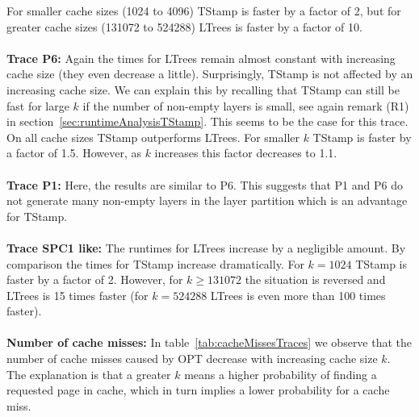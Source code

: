 \documentclass[a4paper,12pt, titlepage]{article}  %
\begin{document}
For smaller cache sizes (1024 to 4096) TStamp is faster by a factor of 2, but for greater 
cache sizes (131072 to 524288) LTrees  is faster by a factor of 10.\\
\\
\textbf{Trace P6:} Again the times for LTrees remain almost constant with increasing cache size (they
even decrease a little).
Surprisingly, TStamp is not affected by an increasing cache size. 
We can explain this by recalling that TStamp can still
be fast for large $k$ if the number of non-empty layers is small, see again remark (R1)
in section~\ref{sec:runtimeAnalysisTStamp}. This seems to be the case for this trace.
On all cache sizes TStamp outperforms LTrees.
For smaller $k$ TStamp is faster by a factor of 1.5. However, as $k$ increases this factor decreases 
to 1.1.
\\
\\
\textbf{Trace P1:} Here, the results are similar to P6. This suggests that P1 and P6 do not generate many
non-empty layers in the layer partition which is an advantage for TStamp.  \\
\\
\textbf{Trace SPC1 like:} The runtimes for LTrees increase by a negligible amount. 
By comparison the times for TStamp increase dramatically. For $k=1024$ TStamp is faster by a factor of 2.
However, for $k \geq 131072$ the situation is reversed and LTrees is 15 times faster (for $k=524288$ LTrees is even more than 100 times faster). \\
\\
\textbf{Number of cache misses:} In table~\ref{tab:cacheMissesTraces} we observe that the number
of cache misses caused by OPT decrease with increasing cache size $k$. The explanation is that a greater $k$ means 
a higher probability of finding a requested page in cache, which in turn implies a lower probability for a cache miss.  


\end{document}
